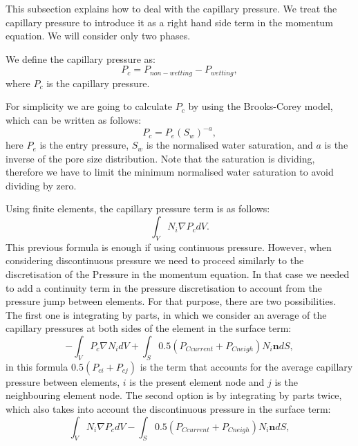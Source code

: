 This subsection explains how to deal with the capillary pressure. We treat the capillary pressure to introduce it as a right hand side term in the momentum equation. We will consider only two phases.

We define the capillary pressure as:
\begin{equation}
P_c = P_{non-wetting} - P_{wetting},
\end{equation}
where $P_c $ is the capillary pressure.
 
For simplicity we are going to calculate $P_c $ by using the Brooks-Corey model, which can be written as follows:
\begin{equation}
P_c = P_e (S_w)^{-a},
\end{equation}
here $P_e$ is the entry pressure, $S_w $ is the normalised water saturation, and $a $ is the inverse of the pore size distribution. Note that the saturation is dividing, therefore we have to limit the minimum normalised water saturation to avoid dividing by zero.

Using finite elements, the capillary pressure term is as follows:
\begin{equation}
\int_V N_i \nabla P_c dV.
\label{Cap_pressure_initial}
\end{equation}
This previous formula is enough if using continuous pressure. However, when considering discontinuous pressure we need to proceed similarly to the discretisation of the Pressure in the momentum equation. In that case we needed to add a continuity term in the pressure discretisation to account from the pressure jump between elements. For that purpose, there are two possibilities. The first one is integrating by parts, in which we consider an average of the capillary pressures at both sides of the element in the surface term:
\begin{equation}
-\int_V P_c \nabla N_{i} dV + \int_S 0.5 (P_{Ccurrent} + P_{Cneigh})  N_{i} \mathbf{n} dS,
\label{cappressure_intbyparts1}
\end{equation}
in this formula $ 0.5 (P_{ci} + P_{cj})$ is the term that accounts for the average capillary pressure between elements, $i$ is the present element node and $j$ is the neighbouring element node. The second option is by integrating by parts twice, which also takes into account the discontinuous pressure in the surface term:
\begin{equation}
\int_V N_{i} \nabla P_c dV - \int_S 0.5 (P_{Ccurrent} + P_{Cneigh})  N_{i} \mathbf{n} dS,
\label{cappressure_intbyparts2}
\end{equation}


